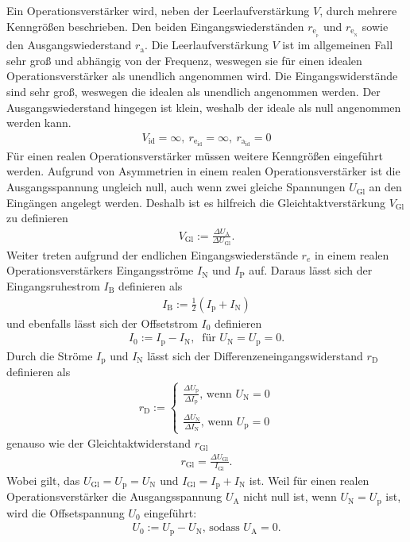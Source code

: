 Ein  Operationsverstärker wird, neben der Leerlaufverstärkung $V$, durch mehrere Kenngrößen beschrieben.
Den beiden Eingangswiederständen $r_{\text{e}_{{}_\text{p}}}$ und $r_{\text{e}_{{}_\text{N}}}$ sowie den Ausgangswiederstand $r_\text{a}$.
Die Leerlaufverstärkung $V$ ist im allgemeinen Fall sehr groß und abhängig von der Frequenz, weswegen sie für einen idealen Operationsverstärker als unendlich angenommen wird.
Die Eingangswiderstände sind sehr groß, weswegen die idealen als unendlich angenommen werden.
Der Ausgangswiederstand hingegen ist klein, weshalb der ideale als null angenommen werden kann.
\begin{align}
	V_\text{id}=\infty,~ r_{\text{e}_\text{id}}=\infty,~ r_{\text{a}_\text{id}}=0
\end{align}
Für einen realen Operationsverstärker müssen weitere Kenngrößen eingeführt werden.
Aufgrund von Asymmetrien in einem realen Operationsverstärker ist die Ausgangsspannung ungleich null, auch wenn zwei gleiche Spannungen $U_\text{Gl}$ an den Eingängen angelegt werden.
Deshalb ist es hilfreich die Gleichtaktverstärkung $V_\text{Gl}$ zu definieren 
\begin{align}
	V_\text{Gl}:=\frac{\Delta U_\text{A}}{\Delta U_\text{Gl}}.
\end{align}
Weiter treten aufgrund der endlichen Eingangswiederstände $r_e$ in einem realen Operationsverstärkers Eingangsströme $I_\text{N}$ und $I_\text{P}$ auf.
Daraus lässt sich der Eingangsruhestrom $I_\text{B}$ definieren als
\begin{align}
	I_\text{B}:=\frac{1}{2}\left( I_\text{p} + I_\text{N} \right)
\end{align}
und ebenfalls lässt sich der Offsetstrom $I_0$ definieren
\begin{align}
	I_0:=I_\text{p}-I_\text{N},~ \text{ für }U_\text{N}=U_\text{p}=0.
\end{align}
Durch die Ströme $I_\text{p}$ und $I_\text{N}$ lässt sich der Differenzeneingangswiderstand $r_\text{D}$ definieren als
\begin{align}
	r_\text{D}:=
	\begin{cases}
		\frac{\Delta U_\text{p}}{\Delta I_\text{p}}\text{, wenn } U_\text{N}=0\\
		\\
		\frac{\Delta U_\text{N}}{\Delta I_\text{N}}\text{, wenn } U_\text{p}=0
	\end{cases}
\end{align}
genauso wie der Gleichtaktwiderstand $r_\text{Gl}$
\begin{align}
	r_\text{Gl}=\frac{\Delta U_\text{Gl}}{I_\text{Gl}}.
\end{align}
Wobei gilt, das $U_\text{Gl}=U_\text{p}=U_\text{N}$ und $I_\text{Gl}=I_\text{p}+I_\text{N}$ ist.
Weil für einen realen Operationsverstärker die Ausgangsspannung $U_\text{A}$ nicht null ist, wenn $U_\text{N}=U_\text{p}$ ist, wird die Offsetspannung $U_0$ eingeführt:
\begin{align}
	U_0:=U_\text{p}-U_\text{N}\text{, sodass }U_\text{A}=0.
\end{align}
